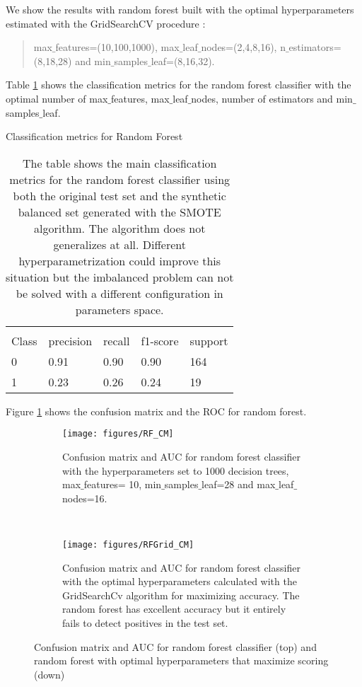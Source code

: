 \documentclass[11pt]{article}
\theoremstyle{definition}
\theoremstyle{remark}
\begin{document}
We show the results with random forest built with the optimal hyperparameters estimated with the GridSearchCV procedure
: 
\begin{quote}
max$\_$features=(10,100,1000), max$\_$leaf$\_$nodes=(2,4,8,16), n$\_$estimators=(8,18,28) and min$\_$samples$\_$leaf=(8,16,32).
\end{quote}

Table \ref{tab:rf} shows the classification metrics for the random forest classifier with the optimal number of max$\_$features, max$\_$leaf$\_$nodes, number of estimators and min$\_$samples$\_$leaf.

\begin{table}[H]
\caption{Classification metrics for Random Forest}
\begin{center} 
\begin{tabular}{lllll}
\hline
\multicolumn{1}{c}{} \\
Class & precision & recall & f1-score & support     \\
\hline
0 & 0.91  &    0.90   &   0.90   &    164 \\
1 & 0.23  &    0.26   &   0.24   &    19\\
\hline
\end{tabular}
\caption{The table shows the main classification metrics for the random forest classifier using both the original test set and the synthetic balanced set generated with the SMOTE algorithm. The algorithm does not generalizes at all. Different hyperparametrization could improve this situation but the imbalanced problem can not be solved with a different configuration in parameters space. }  \label{tab:rf} 
\end{center}
\end{table}

Figure \ref{fig:rf_cm} shows the confusion matrix and the ROC for random forest. 
\begin{figure}[H]
    \centering
    \begin{subfigure}[t]{.9\textwidth}
        \centering
        \texttt{[image: figures/RF\_CM]}
        \caption{Confusion matrix and AUC for random forest classifier with the hyperparameters set to 1000 decision trees, max$\_$features= 10, min$\_$samples$\_$leaf=28 and max$\_$leaf$\_$nodes=16.}
    \end{subfigure}
    ~ 
    \begin{subfigure}[t]{.9\textwidth}
        \centering
        \texttt{[image: figures/RFGrid\_CM]}
        \caption{Confusion matrix and AUC for random forest classifier with the optimal hyperparameters calculated with the GridSearchCv algorithm for maximizing accuracy. The random forest has excellent accuracy but it entirely fails to detect positives in the test set.}
    \end{subfigure}%
    
    \caption{Confusion matrix and AUC for random forest classifier (top) and random forest with optimal hyperparameters that maximize scoring (down)} \label{fig:rf_cm}
\end{figure}
\end{document}
